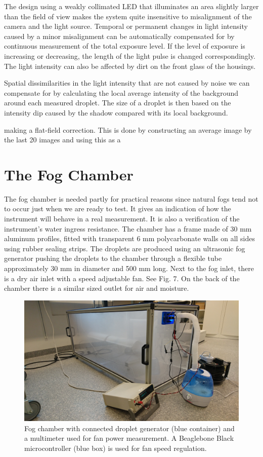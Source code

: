 The design using a weakly collimated LED that illuminates an area slightly larger than the field of view makes the system quite insensitive to misalignment of the camera and the light source. Temporal or permanent changes in light intensity caused by a minor misalignment can be automatically compensated for by continuous measurement of the total exposure level. If the level of exposure is increasing or decreasing, the length of the light pulse is changed correspondingly. The light intensity can also be affected by dirt on the front glass of the housings. 

Spatial dissimilarities in the light intensity that are not caused by noise we can compensate for by calculating the local average intensity of the background around each measured droplet. The size of a droplet is then based on the intensity dip caused by the shadow compared with its local background.


making a flat-field correction. This is done by constructing an average image by the last 20 images and using this as a 


\section{The Fog Chamber}
The fog chamber is needed partly for practical reasons since natural fogs tend not to occur just when we are ready to test. It gives an indication of how the instrument will behave in a real measurement. It is also a verification of the instrument’s water ingress resistance. 
The chamber has a frame made of 30 mm aluminum profiles, fitted with transparent 6 mm polycarbonate walls on all sides using rubber sealing strips. The droplets are produced using an ultrasonic fog generator pushing the droplets to the chamber through a flexible tube approximately 30 mm in diameter and 500 mm long. Next to the fog inlet, there is a dry air inlet with a speed adjustable fan. See Fig. 7. On the back of the chamber there is a similar sized outlet for air and moisture.
 
\begin{figure}%
\centering\includegraphics[width=0.6\linewidth]{figures/DSC_0103}
\caption{Fog chamber with connected droplet generator (blue container) and a multimeter used for fan power measurement. A Beaglebone Black microcontroller (blue box) is used for fan speed regulation.}
\end{figure}





